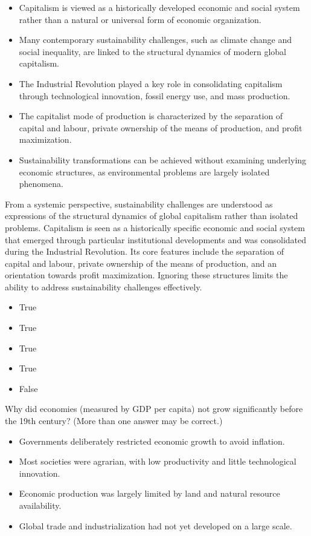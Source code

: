 \documentclass[
  a4paper,
  DIV=11,
  numbers=noendperiod,
  oneside,
  openany]{scrreprt}
\providecommand{\tightlist}{%
  \setlength{\itemsep}{0pt}\setlength{\parskip}{0pt}}
\begin{document}
\begin{itemize}
\tightlist
\item[$\square$]
  Capitalism is viewed as a historically developed economic and social
  system rather than a natural or universal form of economic
  organization.
\item[$\square$]
  Many contemporary sustainability challenges, such as climate change
  and social inequality, are linked to the structural dynamics of modern
  global capitalism.
\item[$\square$]
  The Industrial Revolution played a key role in consolidating
  capitalism through technological innovation, fossil energy use, and
  mass production.
\item[$\square$]
  The capitalist mode of production is characterized by the separation
  of capital and labour, private ownership of the means of production,
  and profit maximization.
\item[$\square$]
  Sustainability transformations can be achieved without examining
  underlying economic structures, as environmental problems are largely
  isolated phenomena.
\end{itemize}

From a systemic perspective, sustainability challenges are understood as
expressions of the structural dynamics of global capitalism rather than
isolated problems. Capitalism is seen as a historically specific
economic and social system that emerged through particular institutional
developments and was consolidated during the Industrial Revolution. Its
core features include the separation of capital and labour, private
ownership of the means of production, and an orientation towards profit
maximization. Ignoring these structures limits the ability to address
sustainability challenges effectively.

\begin{itemize}
\tightlist
\item
  True
\item
  True
\item
  True
\item
  True
\item
  False
\end{itemize}

Why did economies (measured by GDP per capita) not grow significantly
before the 19th century? (More than one answer may be correct.)

\begin{itemize}
\tightlist
\item[$\square$]
  Governments deliberately restricted economic growth to avoid
  inflation.
\item[$\square$]
  Most societies were agrarian, with low productivity and little
  technological innovation.
\item[$\square$]
  Economic production was largely limited by land and natural resource
  availability.
\item[$\square$]
  Global trade and industrialization had not yet developed on a large
  scale.
\end{itemize}
\end{document}
